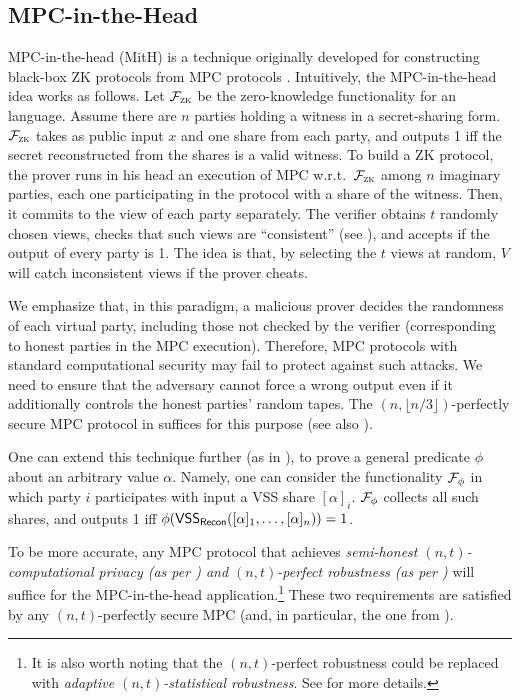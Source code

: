 \subsection{MPC-in-the-Head}
\label{sec:prelim:MitH}


 MPC-in-the-head (MitH) is a technique originally developed for constructing  black-box ZK protocols from MPC protocols \cite{STOC:IKOS07}. Intuitively, the MPC-in-the-head idea works as follows.  Let $\mathcal{F}_\textsc{zk}$ be the zero-knowledge functionality for an \NP language. Assume there are $n$ parties holding a witness in a secret-sharing form. $\mathcal{F}_\textsc{zk}$ takes as public input $x$ and one share from each party, and outputs 1 iff the secret reconstructed from the shares is a valid witness.
To build a ZK protocol, the prover runs in his head an execution of MPC w.r.t.\ $\mathcal{F}_\textsc{zk}$ among $n$ imaginary parties, each one participating in the protocol with a share of the witness. Then, it commits to the view of each party separately. The verifier obtains $t$ randomly chosen views, checks that such views are ``consistent'' (see ), and accepts if the output of every party is 1. The idea is that, by selecting the $t$ views at random, $V$ will catch inconsistent views if the prover cheats.

We emphasize that, in this paradigm, a malicious prover decides the randomness of each virtual party, including those not checked by the verifier (corresponding to honest parties in the MPC execution). Therefore, MPC protocols with standard computational security may fail to protect against such attacks. We need to ensure that the adversary cannot force a wrong output even if it additionally controls the honest parties' random tapes. The $(n,\lfloor n/3 \rfloor)$-perfectly secure MPC protocol in  suffices for this purpose (see also ).

One can extend this technique further (as in \cite{FOCS:GLOV12}), to prove a general predicate $\phi$ about an arbitrary value $\alpha$.  Namely, one can consider the functionality $\mathcal{F}_\phi$ in which party $i$ participates with input a VSS share $[\alpha]_i$. $\mathcal{F}_\phi$ collects all such shares, and outputs 1 iff $\phi(\mathsf{VSS}_\mathsf{Recon}([\alpha]_1,\ldots,[\alpha]_n)) = 1$.



\begin{remark} 
\label{rmk:exact-mpc-requriements:mpc-in-the-head}
To be more accurate, any MPC protocol that achieves {\em semi-honest $(n,t)$-computational privacy (as per ) and $(n,t)$-perfect robustness (as per )} will suffice for the MPC-in-the-head application.\footnote{It is also worth noting that the $(n,t)$-perfect robustness could be replaced with {\em adaptive $(n,t)$-statistical robustness}. See \cite[Section 4.2]{STOC:IKOS07} for more details.} These two requirements are satisfied by any $(n,t)$-perfectly secure MPC (and, in particular, the one from ).
\end{remark}


